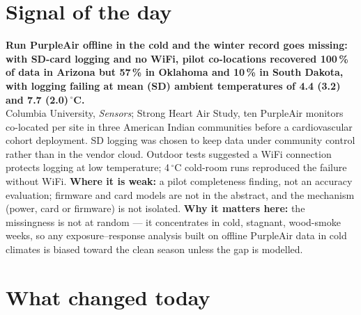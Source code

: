 \documentclass[10pt]{article}
\begin{document}
\vspace{6mm}

\section*{\sffamily\bfseries\color{Deep}Signal of the day}
\vspace{-1.5mm}{\color{Amber}\rule{\linewidth}{1.1pt}}\vspace{2.5mm}

\begin{keybox}
{\sffamily\bfseries\small\color{Deep}Run PurpleAir offline in the cold and the winter record goes missing: with SD-card logging and no WiFi, pilot co-locations recovered 100\,\% of data in Arizona but 57\,\% in Oklahoma and 10\,\% in South Dakota, with logging failing at mean (SD) ambient temperatures of 4.4 (3.2) and 7.7 (2.0)\,$^\circ$C.}\\[1.4mm]
\footnotesize
Columbia University, \textit{Sensors}; Strong Heart Air Study, ten PurpleAir monitors co-located per site in three American Indian communities before a cardiovascular cohort deployment. SD logging was chosen to keep data under community control rather than in the vendor cloud. Outdoor tests suggested a WiFi connection protects logging at low temperature; 4\,$^\circ$C cold-room runs reproduced the failure without WiFi.
\textbf{Where it is weak:} a pilot completeness finding, not an accuracy evaluation; firmware and card models are not in the abstract, and the mechanism (power, card or firmware) is not isolated.
\textbf{Why it matters here:} the missingness is not at random --- it concentrates in cold, stagnant, wood-smoke weeks, so any exposure--response analysis built on offline PurpleAir data in cold climates is biased toward the clean season unless the gap is modelled.\par
\end{keybox}

\vspace{3mm}

\section*{\sffamily\bfseries\color{Deep}What changed today}
\vspace{-1.5mm}{\color{Amber}\rule{\linewidth}{1.1pt}}\vspace{2.5mm}
\end{document}
